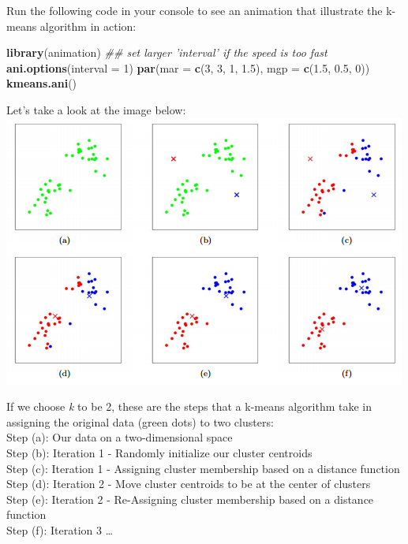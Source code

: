 \documentclass[]{article}
\newenvironment{Shaded}{\begin{snugshade}}{\end{snugshade}}
\newcommand{\CommentTok}[1]{\textcolor[rgb]{0.56,0.35,0.01}{\textit{#1}}}
\newcommand{\DataTypeTok}[1]{\textcolor[rgb]{0.13,0.29,0.53}{#1}}
\newcommand{\DecValTok}[1]{\textcolor[rgb]{0.00,0.00,0.81}{#1}}
\newcommand{\FloatTok}[1]{\textcolor[rgb]{0.00,0.00,0.81}{#1}}
\newcommand{\KeywordTok}[1]{\textcolor[rgb]{0.13,0.29,0.53}{\textbf{#1}}}
\newcommand{\NormalTok}[1]{#1}
\begin{document}
Run the following code in your console to see an animation that
illustrate the k-means algorithm in action:

\begin{Shaded}
\begin{Highlighting}[]
\KeywordTok{library}\NormalTok{(animation)}
\CommentTok{## set larger 'interval' if the speed is too fast}
\KeywordTok{ani.options}\NormalTok{(}\DataTypeTok{interval =} \DecValTok{1}\NormalTok{)}
\KeywordTok{par}\NormalTok{(}\DataTypeTok{mar =} \KeywordTok{c}\NormalTok{(}\DecValTok{3}\NormalTok{, }\DecValTok{3}\NormalTok{, }\DecValTok{1}\NormalTok{, }\FloatTok{1.5}\NormalTok{), }\DataTypeTok{mgp =} \KeywordTok{c}\NormalTok{(}\FloatTok{1.5}\NormalTok{, }\FloatTok{0.5}\NormalTok{, }\DecValTok{0}\NormalTok{))}
\KeywordTok{kmeans.ani}\NormalTok{()}
\end{Highlighting}
\end{Shaded}

Let's take a look at the image below:
\includegraphics{assets/centroids.png}

If we choose \emph{k} to be 2, these are the steps that a k-means
algorithm take in assigning the original data (green dots) to two
clusters:\\
Step (a): Our data on a two-dimensional space\\
Step (b): Iteration 1 - Randomly initialize our cluster centroids\\
Step (c): Iteration 1 - Assigning cluster membership based on a distance
function\\
Step (d): Iteration 2 - Move cluster centroids to be at the center of
clusters\\
Step (e): Iteration 2 - Re-Assigning cluster membership based on a
distance function\\
Step (f): Iteration 3 \ldots{}
\end{document}
